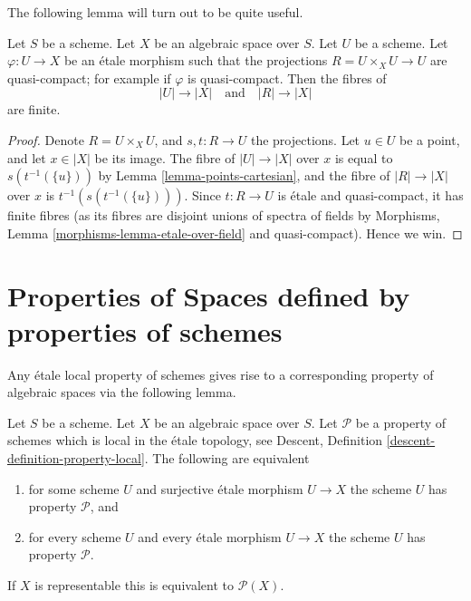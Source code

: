 \noindent
The following lemma will turn out to be quite useful.

\begin{lemma}
\label{lemma-finite-fibres-presentation}
Let $S$ be a scheme.
Let $X$ be an algebraic space over $S$.
Let $U$ be a scheme. Let $\varphi : U \to X$ be an \'etale morphism such that
the projections $R = U \times_X U \to U$ are quasi-compact; for example if
$\varphi$ is quasi-compact. Then the fibres of
$$
|U| \to |X|
\quad\text{and}\quad
|R| \to |X|
$$
are finite.
\end{lemma}

\begin{proof}
Denote $R = U \times_X U$, and $s, t : R \to U$ the projections.
Let $u \in U$ be a point, and let $x \in |X|$ be its image.
The fibre of $|U| \to |X|$ over $x$ is equal to
$s(t^{-1}(\{u\}))$ by
Lemma \ref{lemma-points-cartesian},
and the fibre of $|R| \to |X|$ over $x$ is $t^{-1}(s(t^{-1}(\{u\})))$.
Since $t : R \to U$ is \'etale and quasi-compact, it has finite fibres
(as its fibres are disjoint unions of spectra of fields by
Morphisms, Lemma \ref{morphisms-lemma-etale-over-field}
and quasi-compact). Hence we win.
\end{proof}








\section{Properties of Spaces defined by properties of schemes}
\label{section-types-properties}

\noindent
Any \'etale local property of schemes gives rise to a corresponding
property of algebraic spaces via the following lemma.

\begin{lemma}
\label{lemma-type-property}
Let $S$ be a scheme.
Let $X$ be an algebraic space over $S$.
Let $\mathcal{P}$ be a property of schemes which is local in the \'etale
topology, see
Descent, Definition \ref{descent-definition-property-local}.
The following are equivalent
\begin{enumerate}
\item for some scheme $U$ and surjective \'etale morphism $U \to X$
the scheme $U$ has property $\mathcal{P}$, and
\item for every scheme $U$ and every \'etale morphism $U \to X$
the scheme $U$ has property $\mathcal{P}$.
\end{enumerate}
If $X$ is representable this is equivalent to $\mathcal{P}(X)$.
\end{lemma}

